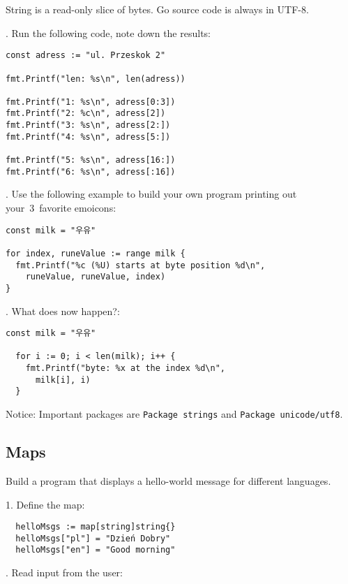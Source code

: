 \documentclass[11pt, letterpaper]{article}
\begin{document}
String is a read-only slice of bytes. Go source code is always in UTF-8.

. Run the following code, note down the results:

\begin{verbatim}
const adress := "ul. Przeskok 2"

fmt.Printf("len: %s\n", len(adress))

fmt.Printf("1: %s\n", adress[0:3])
fmt.Printf("2: %c\n", adress[2])
fmt.Printf("3: %s\n", adress[2:])
fmt.Printf("4: %s\n", adress[5:])

fmt.Printf("5: %s\n", adress[16:])
fmt.Printf("6: %s\n", adress[:16])
\end{verbatim}


. Use the following example to build your own program printing out your~3~favorite emoicons:

\begin{verbatim}
const milk = "우유"

for index, runeValue := range milk {
  fmt.Printf("%c (%U) starts at byte position %d\n",
    runeValue, runeValue, index)
}
\end{verbatim}

. What does now happen?:

\begin{verbatim}
const milk = "우유"

  for i := 0; i < len(milk); i++ {
    fmt.Printf("byte: %x at the index %d\n",
      milk[i], i)
  }
\end{verbatim}

\bigskip
Notice: Important packages are \verb|Package strings| and \verb|Package unicode/utf8|.

\subsection{Maps}

Build a program that displays a hello-world message for different languages.

1. Define the map:

\begin{verbatim}
  helloMsgs := map[string]string{}
  helloMsgs["pl"] = "Dzień Dobry"
  helloMsgs["en"] = "Good morning" 
\end{verbatim}

. Read input from the user:
\end{document}
